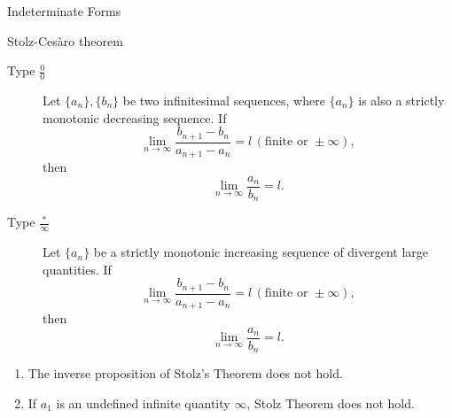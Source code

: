\documentclass[11pt]{../../TexTemplate/elegantbook}
\begin{document}
\begin{leftbarTitle}{Indeterminate Forms}\end{leftbarTitle}

\begin{theorem}{Stolz-Cesàro theorem}\label{thm:Stolz Theorem}
    \begin{description}
        \item[Type \(\frac{0}{0}\)] Let \(\{a_n\}, \{b_n\}\) be two infinitesimal sequences, 
            where \(\{a_n\}\) is also a strictly monotonic decreasing sequence. If  
            \[
            \lim_{n \to \infty} \frac{b_{n+1} - b_n}{a_{n+1} - a_n} = l \, (\text{finite or } \pm\infty),
            \]  
            then  
            \[
            \lim_{n \to \infty} \frac{a_n}{b_n} = l.
            \] 
        \item[Type \(\frac{\text{*}}{\infty}\)] Let \(\{a_n\}\) be a strictly monotonic increasing sequence 
            of divergent large quantities. If  
            \[
            \lim_{n \to \infty} \frac{b_{n+1} - b_n}{a_{n+1} - a_n} = l \, (\text{finite or } \pm\infty),
            \]  
            then  
            \[
            \lim_{n \to \infty} \frac{a_n}{b_n} = l.
            \]
    \end{description}
\end{theorem}
\begin{note}
    \begin{enumerate}
        \item The inverse proposition of Stolz's Theorem does not hold.
        \item If \(a_1\) is an undefined infinite quantity \(\infty\), Stolz Theorem does not hold.
    \end{enumerate}
\end{note}
\end{document}
